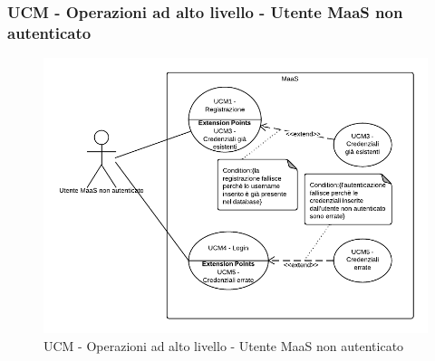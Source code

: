 \subsubsection{UCM - Operazioni ad alto livello - Utente MaaS non autenticato} 
    \begin{figure}[H]
      \begin{center}
      \includegraphics[scale=0.16]{UML/UCM - Operazioni ad alto livello - Utente MaaS non autenticato.png}
      \caption{UCM - Operazioni ad alto livello - Utente MaaS non autenticato}
      \end{center} 
    \end{figure}  
    
